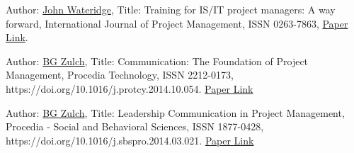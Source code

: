 \documentclass[runningheads]{llncs}
\begin{document}
\begin{thebibliography}{8}
Author: \href{https://www.scopus.com/authid/detail.uri?authorId=6602223274}{John Wateridge},
Title: Training for IS/IT project managers: A way forward, International Journal of Project Management, ISSN 0263-7863, \href{https://doi.org/10.1016/S0263-7863(96)00085-3}{Paper Link}.

Author: \href{https://scholar.google.com/citations?user=WjhruLQAAAAJ&hl=en}{BG Zulch},
Title: Communication: The Foundation of Project Management, Procedia Technology, ISSN 2212-0173,
https://doi.org/10.1016/j.protcy.2014.10.054. \href{https://www.sciencedirect.com/science/article/pii/S2212017314002813}{Paper Link}

Author: \href{https://scholar.google.com/citations?user=WjhruLQAAAAJ&hl=en}{BG Zulch},
Title: Leadership Communication in Project Management, Procedia - Social and Behavioral Sciences, ISSN 1877-0428, https://doi.org/10.1016/j.sbspro.2014.03.021.
\href{https://www.sciencedirect.com/science/article/pii/S1877042814021120}{Paper Link}
\end{thebibliography}
\end{document}
